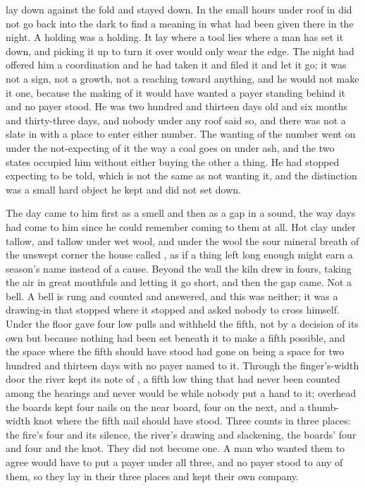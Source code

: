 
 lay down against the fold and stayed down. In the small hours under  roof in   did not go back into the dark to find a meaning in what had been given there in the night. A holding was a holding. It lay where a tool lies where a man has set it down, and picking it up to turn it over would only wear the edge. The night had offered him a coordination and he had taken it and filed it and let it go; it was not a sign, not a growth, not a reaching toward anything, and he would not make it one, because the making of it would have wanted a payer standing behind it and no payer stood. He was two hundred and thirteen days old and six months and thirty-three days, and nobody under any roof said so, and there was not a slate in  with a place to enter either number. The wanting of the number went on under the not-expecting of it the way a coal goes on under ash, and the two states occupied him without either buying the other a thing. He had stopped expecting to be told, which is not the same as not wanting it, and the distinction was a small hard object he kept and did not set down.

The day came to him first as a smell and then as a gap in a sound, the way days had come to him since he could remember coming to them at all. Hot clay under tallow, and tallow under wet wool, and under the wool the sour mineral breath of the unswept corner the house called , as if a thing left long enough might earn a season's name instead of a cause. Beyond the wall the kiln drew in fours, taking the air in great mouthfuls and letting it go short, and then the gap came. Not a bell. A bell is rung and counted and answered, and this was neither; it was a drawing-in that stopped where it stopped and asked nobody to cross himself. Under the floor  gave four low pulls and withheld the fifth, not by a decision of its own but because nothing had been set beneath it to make a fifth possible, and the space where the fifth should have stood had gone on being a space for two hundred and thirteen days with no payer named to it. Through the finger's-width door the river kept its note of , a fifth low thing that had never been counted among the hearings and never would be while nobody put a hand to it; overhead the boards kept four nails on the near board, four on the next, and a thumb-width knot where the fifth nail should have stood. Three counts in three places: the fire's four and its silence, the river's drawing and slackening, the boards' four and four and the knot. They did not become one. A man who wanted them to agree would have to put a payer under all three, and no payer stood to any of them, so they lay in their three places and kept their own company.


